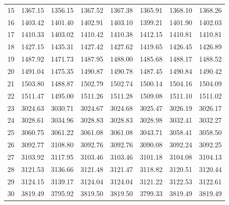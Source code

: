 \documentclass[10pt,oneside]{article}
\begin{document}
\begin{table}[h!]
\begin{tabular}{cccccccc}
15 &   1367.15 & 1356.15 & 1367.52 &    1367.38 &      1365.91 & 1368.10 &   1368.26 \\
16 &   1403.42 & 1401.40 & 1402.91 &    1403.10 &      1399.21 & 1401.90 &   1402.03 \\
17 &   1410.33 & 1403.02 & 1410.42 &    1410.38 &      1412.15 & 1410.81 &   1410.81 \\
18 &   1427.15 & 1435.31 & 1427.42 &    1427.62 &      1419.65 & 1426.45 &   1426.89 \\
19 &   1487.92 & 1471.73 & 1487.95 &    1488.00 &      1485.68 & 1488.17 &   1488.52 \\
20 &   1491.04 & 1475.35 & 1490.87 &    1490.78 &      1487.45 & 1490.84 &   1490.42 \\
21 &   1503.80 & 1488.87 & 1502.79 &    1502.74 &      1500.14 & 1504.16 &   1504.09 \\
22 &   1511.47 & 1495.00 & 1511.26 &    1511.28 &      1509.08 & 1511.10 &   1511.02 \\
23 &   3024.63 & 3030.71 & 3024.67 &    3024.68 &      3025.47 & 3026.19 &   3026.17 \\
24 &   3028.61 & 3034.96 & 3028.83 &    3028.83 &      3028.98 & 3032.41 &   3032.27 \\
25 &   3060.75 & 3061.22 & 3061.08 &    3061.08 &      3043.71 & 3058.41 &   3058.50 \\
26 &   3092.77 & 3108.80 & 3092.76 &    3092.76 &      3090.08 & 3092.24 &   3092.25 \\
27 &   3103.92 & 3117.95 & 3103.46 &    3103.46 &      3101.18 & 3104.08 &   3104.13 \\
28 &   3121.53 & 3136.66 & 3121.48 &    3121.47 &      3118.82 & 3120.51 &   3120.44 \\
29 &   3124.15 & 3139.17 & 3124.04 &    3124.04 &      3121.22 & 3122.53 &   3122.61 \\
30 &   3819.49 & 3795.92 & 3819.50 &    3819.50 &      3799.33 & 3819.49 &   3819.49 \\
\bottomrule
\end{tabular}
\end{table}
\end{document}
